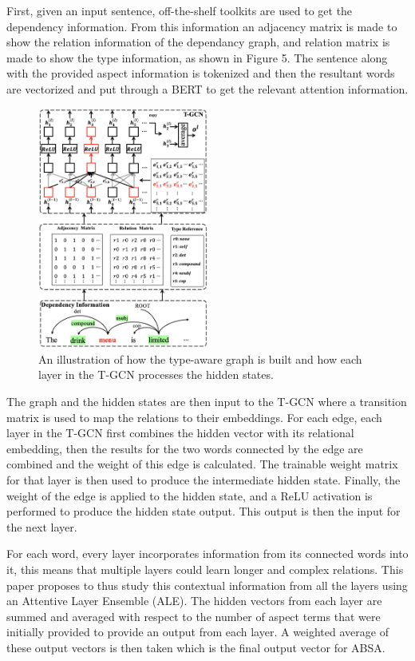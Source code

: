 \documentclass[conference]{IEEEtran}
\begin{document}
First, given an input sentence, off-the-shelf toolkits are used to get the dependency information. From this information an adjacency matrix is made to show the relation information of the dependancy graph, and relation matrix is made to show the type information, as shown in Figure 5. The sentence along with the provided aspect information is tokenized and then the resultant words are vectorized and put through a BERT to get the relevant attention information.

\begin{figure}[htbp]
\centerline{\includegraphics[keepaspectratio, width=0.5\textwidth]{pics/5.png}}
\caption{An illustration of how the type-aware graph is built and how each layer in the T-GCN processes the hidden states.}
\label{fig}
\end{figure}

The graph and the hidden states are then input to the T-GCN where a transition matrix is used to map the relations to their embeddings. For each edge, each layer in the T-GCN first combines the hidden vector with its relational embedding, then the results for the two words connected by the edge are combined and the weight of this edge is calculated. The trainable weight matrix for that layer is then used to produce the intermediate hidden state. Finally, the weight of the edge is applied to the hidden state, and a ReLU activation is performed to produce the hidden state output. This output is then the input for the next layer.

For each word, every layer incorporates information from its connected words into it, this means that multiple layers could learn longer and complex relations. This paper proposes to thus study this contextual information from all the layers using an Attentive Layer Ensemble (ALE). The hidden vectors from each layer are summed and averaged with respect to the number of aspect terms that were initially provided to provide an output from each layer. A weighted average of these output vectors is then taken which is the final output vector for ABSA.
\end{document}
